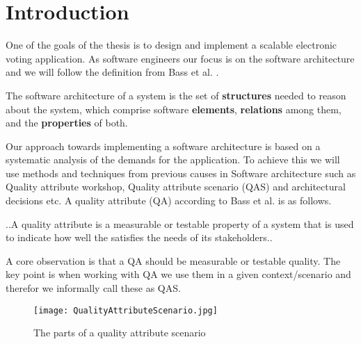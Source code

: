 \section{Introduction}
One of the goals of the thesis is to design and implement a scalable electronic voting application. As software engineers our focus is on the software architecture and we will follow the definition from Bass et al. \cite{Bass}. 


\begin{defi}
The software architecture of a system is the set of \textbf{structures} needed to reason about the system, which comprise software \textbf{elements}, \textbf{relations} among them, and the \textbf{properties} of both.  \cite{Bass}
\end{defi}

\noindent
Our approach towards implementing a software architecture is based on a systematic analysis of the demands for the application. To achieve this we will use methods and techniques from previous causes in Software architecture such as  Quality attribute workshop, Quality attribute scenario (QAS) and architectural decisions etc. A quality attribute (QA) according to Bass et al. is as follows.


\begin{defi}
..A quality attribute is a measurable or testable property of a system that is used to indicate how well the satisfies the needs of its stakeholders..  \cite{Bass}
\end{defi}

\noindent
A core observation is that a QA should be measurable or testable quality. The key point is when working with QA we use them in a given context/scenario and therefor we informally call these as QAS.\\


\begin{figure}[H]
\centering
\texttt{[image: QualityAttributeScenario.jpg]}

\caption{The parts of a quality attribute scenario}
\label{fig:Quality_Attribute_Scenario}
\end{figure}





